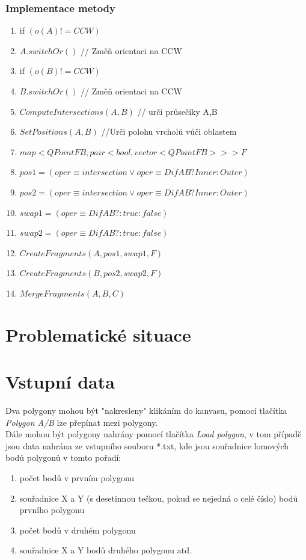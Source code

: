 \documentclass[a4paper, 12pt]{article}
\begin{document}
\subsubsection{Implementace metody}
\begin{enumerate}
	\item if $ (o(A) != CCW) $
	\item \hspace{1cm} $ A.switchOr() $ // Změň orientaci na CCW
	\item if $ (o(B) != CCW) $
	\item \hspace{1cm} $ B.switchOr() $ // Změň orientaci na CCW
	\item $ ComputeIntersections(A,B) $ // urči průsečíky A,B
	\item $ SetPositions (A,B) $ //Urči polohu vrcholů vůči oblastem
	\item $map <QPointFB, pair <bool, vector<QPointFB>>> F$
	\item $ pos1 = (oper \equiv intersection \vee oper \equiv DifAB?Inner:Outer) $
	\item $ pos2 = (oper \equiv intersection \vee oper \equiv DifAB?Inner:Outer) $
	\item $ swap1 = (oper \equiv DifAB? : true : false) $
	\item $ swap2 = (oper \equiv DifAB? : true : false) $
	\item $ CreateFragments (A, pos1, swap1, F) $
	\item $ CreateFragments (B, pos2, swap2, F) $
	\item $ MergeFragments (A,B,C) $
\end{enumerate}

\clearpage

\section{Problematické situace}
\clearpage

\section{Vstupní data}

Dva polygony mohou být "nakresleny" klikáním do kanvasu, pomocí tlačítka \textit{Polygon A/B} lze přepínat mezi polygony.\\

\noindent Dále mohou být polygony nahrány pomocí tlačítka \textit{Load polygon}, v tom případě jsou data nahrána ze vstupního souboru *.txt, kde jsou souřadnice lomových bodů polygonů v tomto pořadí:
\begin{enumerate}
\item	počet bodů v prvním polygonu 
\item	 souřadnice X a Y (s desetinnou tečkou, pokud se nejedná o celé číslo) bodů prvního polygonu
\item	 počet bodů v druhém polygonu
\item souřadnice X a Y bodů druhého polygonu atd.
\end{enumerate}
\end{document}
